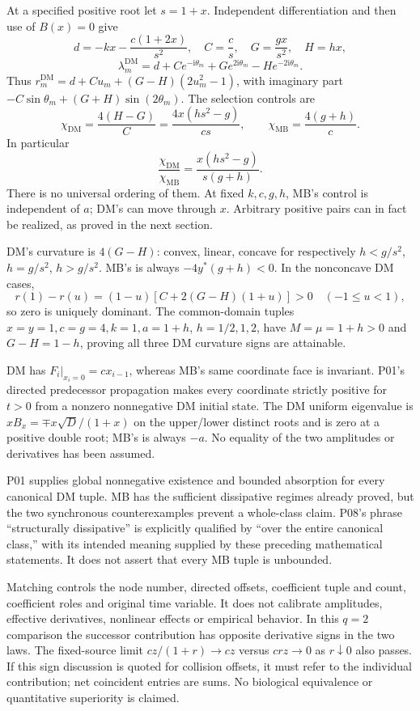 \documentclass[11pt]{article}
\newcommand{\DM}{\mathrm{DM}}
\newcommand{\MB}{\mathrm{MB}}
\begin{document}
At a specified positive root let $s=1+x$. Independent differentiation
and then use of $B(x)=0$ give
\[
 d=-kx-\frac{c(1+2x)}{s^2},\quad C=\frac cs,\quad
 G=\frac{gx}{s^2},\quad H=hx,
\]
\[
 \lambda_m^{\DM}=d+Ce^{-\mathrm i\theta_m}
                       +Ge^{2\mathrm i\theta_m}-He^{-2\mathrm i\theta_m}.
\]
Thus $r_m^{\DM}=d+Cu_m+(G-H)(2u_m^2-1)$, with imaginary part
$-C\sin\theta_m+(G+H)\sin(2\theta_m)$. The selection controls are
\[
 \chi_{\DM}=\frac{4(H-G)}C
 =\frac{4x(hs^2-g)}{cs},\qquad
 \chi_{\MB}=\frac{4(g+h)}c.
\]
In particular
\[
 \frac{\chi_{\DM}}{\chi_{\MB}}
 =\frac{x(hs^2-g)}{s(g+h)}.
\]
There is no universal ordering of them. At fixed $k,c,g,h$, MB's
control is independent of $a$; DM's can move through $x$. Arbitrary
positive pairs can in fact be realized, as proved in the next section.

DM's curvature is $4(G-H)$: convex, linear, concave for respectively
$h<g/s^2$, $h=g/s^2$, $h>g/s^2$. MB's is always
$-4y^*(g+h)<0$. In the nonconcave DM cases,
\[
 r(1)-r(u)=(1-u)[C+2(G-H)(1+u)]>0\quad(-1\le u<1),
\]
so zero is uniquely dominant. The common-domain tuples
$x=y=1,c=g=4,k=1,a=1+h$, $h=1/2,1,2$, have $M=\mu=1+h>0$
and $G-H=1-h$, proving all three DM curvature signs are attainable.

DM has $F_i|_{x_i=0}=cx_{i-1}$, whereas MB's same coordinate face is
invariant. P01's directed predecessor propagation makes every coordinate
strictly positive for $t>0$ from a nonzero nonnegative DM initial state.
The DM uniform eigenvalue is $xB_x=\mp x\sqrt D/(1+x)$ on the
upper/lower distinct roots and is zero at a positive double root;
MB's is always $-a$. No equality of the two amplitudes or derivatives
has been assumed.

P01 supplies global nonnegative existence and bounded absorption for
every canonical DM tuple. MB has the sufficient dissipative regimes
already proved, but the two synchronous counterexamples prevent a
whole-class claim. P08's phrase ``structurally dissipative'' is explicitly
qualified by ``over the entire canonical class,'' with its intended
meaning supplied by these preceding mathematical statements. It does
not assert that every MB tuple is unbounded.

Matching controls the node number, directed offsets, coefficient tuple
and count, coefficient roles and original time variable. It does not
calibrate amplitudes, effective derivatives, nonlinear effects or empirical
behavior. In this $q=2$ comparison the successor contribution has
opposite derivative signs in the two laws. The fixed-source limit
$cz/(1+r)\to cz$ versus $crz\to0$ as $r\downarrow0$ also passes.
If this sign discussion is quoted for collision offsets, it must refer
to the individual contribution; net coincident entries are sums.
No biological equivalence or quantitative superiority is claimed.
\end{document}
